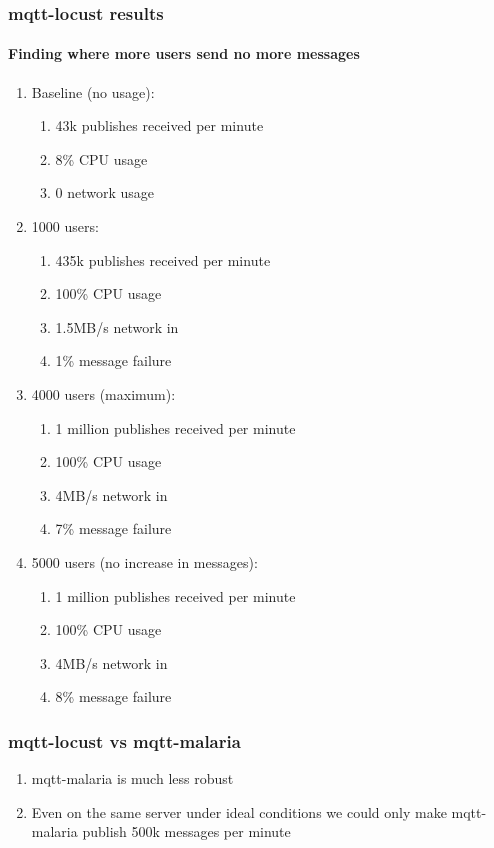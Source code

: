 \documentclass{beamer}
\begin{document}
\begin{frame}
    \frametitle{mqtt-locust results}
    \framesubtitle{Finding where more users send no more messages}
    \begin{enumerate}
        \item Baseline (no usage):
            \begin{enumerate}
                \item 43k publishes received per minute
                \item 8\% CPU usage
                \item 0 network usage
            \end{enumerate}
        \item 1000 users:
            \begin{enumerate}
                \item 435k publishes received per minute
                \item 100\% CPU usage
                \item 1.5MB/s network in
                \item 1\% message failure
            \end{enumerate}
        \item 4000 users (maximum):
            \begin{enumerate}
                \item 1 million publishes received per minute
                \item 100\% CPU usage
                \item 4MB/s network in
                \item 7\% message failure
            \end{enumerate}
        \item 5000 users (no increase in messages):
            \begin{enumerate}
                \item 1 million publishes received per minute
                \item 100\% CPU usage
                \item 4MB/s network in
                \item 8\% message failure
            \end{enumerate}
    \end{enumerate}
\end{frame}

\begin{frame}
    \frametitle{mqtt-locust vs mqtt-malaria}
    \begin{enumerate}
        \item mqtt-malaria is much less robust
        \item
            Even on the same server under ideal conditions we could only make
            mqtt-malaria publish 500k messages per minute
    \end{enumerate}
\end{frame}
\end{document}
